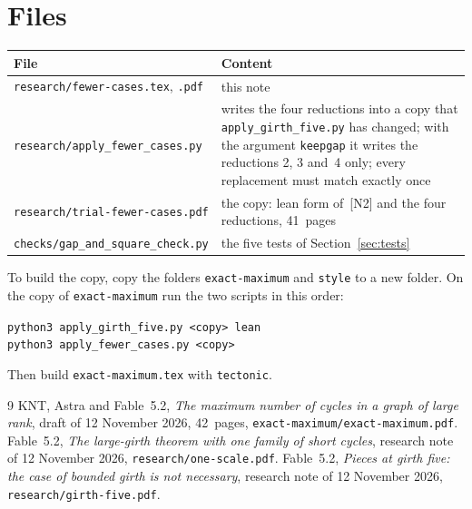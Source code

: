 \documentclass[11pt]{article}
\begin{document}
\section{Files}\label{sec:files}

\begin{center}\small
\begin{tabular}{@{}p{6.1cm}p{8.4cm}@{}}
\toprule
\textsf{\textbf{File}} & \textsf{\textbf{Content}}\\
\midrule
\texttt{research/fewer-cases.tex}, \texttt{.pdf} & this note\\
\texttt{research/apply\_fewer\_cases.py} & writes the four reductions into a copy that
\texttt{apply\_girth\_five.py} has changed; with the argument \texttt{keepgap} it writes the
reductions 2, 3 and~4 only; every replacement must match exactly once\\
\texttt{research/trial-fewer-cases.pdf} & the copy: lean form of~[N2] and the four reductions,
41~pages\\
\texttt{checks/gap\_and\_square\_check.py} & the five tests of Section~\ref{sec:tests}\\
\bottomrule
\end{tabular}
\end{center}

\noindent To build the copy, copy the folders \texttt{exact-maximum} and \texttt{style} to a
new folder. On the copy of \texttt{exact-maximum} run the two scripts in this order:
\begin{center}
\texttt{python3 apply\_girth\_five.py <copy> lean}\\
\texttt{python3 apply\_fewer\_cases.py <copy>}
\end{center}
Then build \texttt{exact-maximum.tex} with \texttt{tectonic}.

\begin{thebibliography}{9}\small
{} KNT, Astra and Fable~5.2, \emph{The maximum number of cycles in a graph of large
rank}, draft of 12 November 2026, 42~pages, \texttt{exact-maximum/exact-maximum.pdf}.
 Fable~5.2, \emph{The large-girth theorem with one family of short cycles},
research note of 12 November 2026, \texttt{research/one-scale.pdf}.
 Fable~5.2, \emph{Pieces at girth five: the case of bounded girth is not
necessary}, research note of 12 November 2026, \texttt{research/girth-five.pdf}.
\end{thebibliography}
\end{document}
